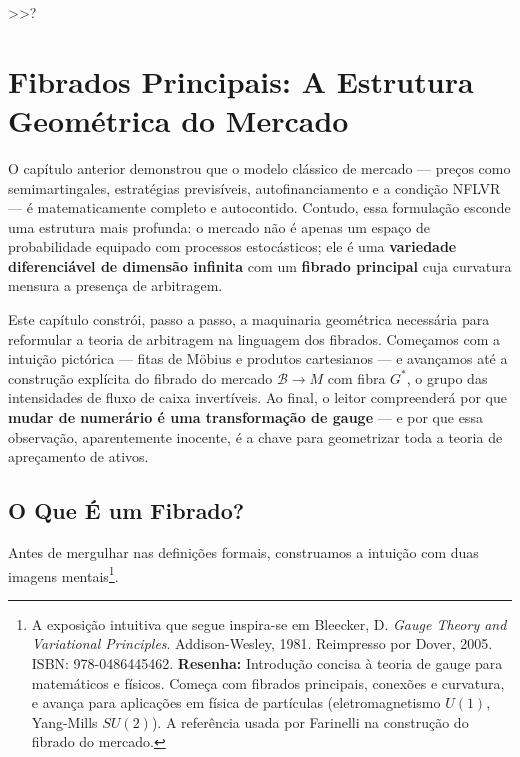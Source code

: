  >>?%
\chapter{Fibrados Principais: A Estrutura Geom\'etrica do Mercado}

O cap\'itulo anterior demonstrou que o modelo cl\'assico de mercado --- pre\c{c}os
como semimartingales, estrat\'egias previs\'iveis, autofinanciamento e a
condi\c{c}\~ao NFLVR --- \'e matematicamente completo e autocontido. Contudo,
essa formula\c{c}\~ao esconde uma estrutura mais profunda: o mercado n\~ao \'e
apenas um espa\c{c}o de probabilidade equipado com processos estoc\'asticos; ele
\'e uma \textbf{variedade diferenci\'avel de dimens\~ao infinita} com um
\textbf{fibrado principal} cuja curvatura mensura a presen\c{c}a de arbitragem.

Este cap\'itulo constr\'oi, passo a passo, a maquinaria geom\'etrica necess\'aria
para reformular a teoria de arbitragem na linguagem dos fibrados. Come\c{c}amos
com a intui\c{c}\~ao pict\'orica --- fitas de M\"obius e produtos cartesianos ---
e avan\c{c}amos at\'e a constru\c{c}\~ao expl\'icita do fibrado do mercado
$\mathcal{B} \to M$ com fibra $G^*$, o grupo das intensidades de fluxo de caixa
invert\'iveis. Ao final, o leitor compreender\'a por que \textbf{mudar de
numer\'ario \'e uma transforma\c{c}\~ao de gauge} --- e por que essa observa\c{c}\~ao,
aparentemente inocente, \'e a chave para geometrizar toda a teoria de
apre\c{c}amento de ativos.

\section{O Que \'E um Fibrado?}

Antes de mergulhar nas defini\c{c}\~oes formais, construamos a intui\c{c}\~ao
com duas imagens mentais\footnote{A exposi\c{c}\~ao intuitiva que segue inspira-se
em Bleecker, D. \textit{Gauge Theory and Variational Principles}. Addison-Wesley,
1981. Reimpresso por Dover, 2005. ISBN: 978-0486445462. \textbf{Resenha:}
Introdu\c{c}\~ao concisa \`a teoria de gauge para matem\'aticos e f\'isicos.
Come\c{c}a com fibrados principais, conex\~oes e curvatura, e avan\c{c}a para
aplica\c{c}\~oes em f\'isica de part\'iculas (eletromagnetismo $U(1)$,
Yang-Mills $SU(2)$). A refer\^encia usada por Farinelli na constru\c{c}\~ao do
fibrado do mercado.}.

